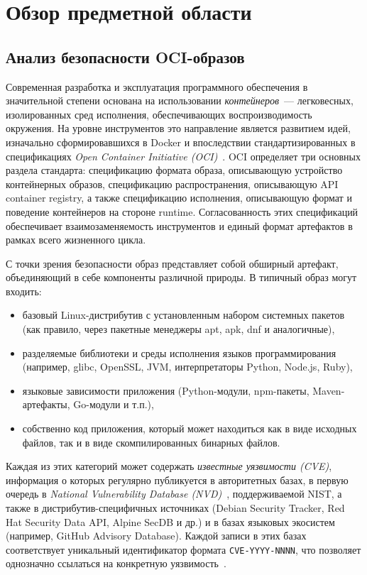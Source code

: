\section{Обзор предметной области}
\label{sec:Chapter1} 

\subsection{Анализ безопасности OCI-образов}

Современная разработка и эксплуатация программного обеспечения в значительной степени основана на использовании \textit{контейнеров}~--- легковесных, изолированных сред исполнения, обеспечивающих воспроизводимость окружения. На уровне инструментов это направление является развитием идей, изначально сформировавшихся в Docker и впоследствии стандартизированных в спецификациях \textit{Open Container Initiative (OCI)}~\cite{oci}. OCI определяет три основных раздела стандарта: спецификацию формата образа, описывающую устройство контейнерных образов, спецификацию распространения, описывающую API container registry, а также спецификацию исполнения, описывающую формат и поведение контейнеров на стороне runtime. Согласованность этих спецификаций обеспечивает взаимозаменяемость инструментов и единый формат артефактов в рамках всего жизненного цикла.

С точки зрения безопасности образ представляет собой обширный артефакт, объединяющий в себе компоненты различной природы. В типичный образ могут входить:

\begin{itemize}
\item базовый Linux-дистрибутив с установленным набором системных пакетов (как правило, через пакетные менеджеры apt, apk, dnf и аналогичные),
\item разделяемые библиотеки и среды исполнения языков программирования (например, glibc, OpenSSL, JVM, интерпретаторы Python, Node.js, Ruby),
\item языковые зависимости приложения (Python-модули, npm-пакеты, Maven-артефакты, Go-модули и т.п.),
\item собственно код приложения, который может находиться как в виде исходных файлов, так и в виде скомпилированных бинарных файлов.
\end{itemize}

Каждая из этих категорий может содержать \textit{известные уязвимости (CVE)}, информация о которых регулярно публикуется в авторитетных базах, в первую очередь в \textit{National Vulnerability Database (NVD)}~\cite{nvd}, поддерживаемой NIST, а также в дистрибутив-специфичных источниках (Debian Security Tracker, Red Hat Security Data API, Alpine SecDB и др.) и в базах языковых экосистем (например, GitHub Advisory Database). Каждой записи в этих базах соответствует уникальный идентификатор формата \texttt{CVE-YYYY-NNNN}, что позволяет однозначно ссылаться на конкретную уязвимость~\cite{cve}.

